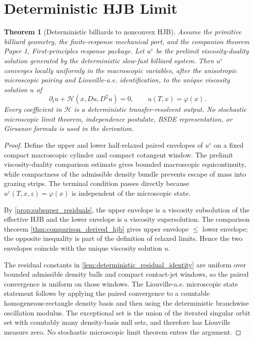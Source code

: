 \documentclass[11pt]{amsart}
\newtheorem{theorem}{Theorem}[section]
\theoremstyle{definition}
\theoremstyle{remark}
\newcommand{\Hcal}{\mathcal H}
\newcommand{\PaperOne}[2]{Paper 1, \emph{#1}}
\begin{document}
\section{Deterministic HJB Limit}

\begin{theorem}[Deterministic billiards to nonconvex HJB]
\label{thm:main_hjb_limit}
Assume the primitive billiard geometry, the finite-response mechanical port, and
the companion theorem
\PaperOne{First-principles response package}{thm:main_response_package}.  Let
$u^\varepsilon$ be the prelimit viscosity-duality solution generated by the
deterministic slow-fast billiard system.  Then $u^\varepsilon$ converges locally
uniformly in the macroscopic variables, after the anisotropic microscopic
pairing and Liouville-a.e. identification, to the unique viscosity solution $u$ of
\begin{equation}
  \partial_t u+\Hcal(x,Du,D^2u)=0,
  \qquad u(T,x)=\varphi(x).
\end{equation}
Every coefficient in $\Hcal$ is a deterministic transfer-resolvent output.  No
stochastic microscopic limit theorem, independence postulate, BSDE
representation, or Girsanov formula is used in the derivation.
\end{theorem}

\begin{proof}
Define the upper and lower half-relaxed paired envelopes of
$u^\varepsilon$ on a fixed compact macroscopic cylinder and compact cotangent
window.  The prelimit viscosity-duality comparison estimate gives bounded
macroscopic equicontinuity, while compactness of the admissible density bundle
prevents escape of mass into grazing strips.  The terminal condition passes
directly because $u^\varepsilon(T,x,z)=\varphi(x)$ is independent of the
microscopic state.

By \cref{prop:subsuper_residuals}, the upper envelope is a viscosity
subsolution of the effective HJB and the lower envelope is a viscosity
supersolution.  The comparison theorem \cref{thm:comparison_derived_hjb} gives
upper envelope $\le$ lower envelope; the opposite inequality is part of the
definition of relaxed limits.  Hence the two envelopes coincide with the unique
viscosity solution $u$.

The residual constants in \cref{lem:deterministic_residual_identity} are uniform
over bounded admissible density balls and compact contact-jet windows, so the
paired convergence is uniform on those windows.  The Liouville-a.e. microscopic
state statement follows by applying the paired convergence to a countable
homogeneous-rectangle density basis and then using the deterministic branchwise
oscillation modulus.  The exceptional set is the union of the iterated singular
orbit set with countably many density-basis null sets, and therefore has
Liouville measure zero.  No stochastic microscopic limit theorem enters the
argument.
\end{proof}
\end{document}
